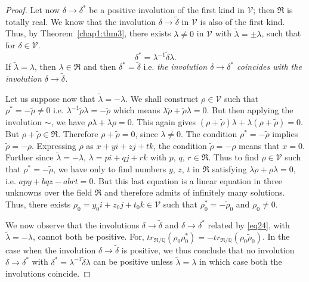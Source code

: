 \begin{proof}
Let now $\delta \rightarrow \delta^{\ast}$ be a positive involution of
the first kind in $\mathscr{V}$; then $\mathfrak{R}$ is totally
real. We know that the involution $\delta \rightarrow
\widetilde{\delta}$ in $\mathscr{V}$ is also of the first kind. Thus,
by Theorem~\ref{chap1:thm3}, there exists $\lambda \neq 0$ in $\mathscr{V}$ with
$\widetilde{\lambda} = \pm \lambda$, such that for $\delta \in
\mathscr{V}$. 
\begin{equation*}
\delta^{\ast} = \lambda^{-1} \widetilde{\delta} \lambda. \tag{24}\label{eq24}
\end{equation*}\pageoriginale
If $\widetilde{\lambda} = \lambda$, then $\lambda \in \mathfrak{R}$
and then $\delta^{\ast} = \widetilde{\delta}$ i.e. {\em the involution
$\delta \rightarrow \delta^{\ast}$ coincides with the involution
  $\delta \rightarrow \widetilde{\delta}$.}

Let us suppose now that $\widetilde{\lambda} = - \lambda$. We shall
construct $\rho \in \mathscr{V}$ such that $\rho^{\ast} = -
\widetilde{\rho} \neq 0$ i.e. $\lambda^{-1} \widetilde{\rho} \lambda =
- \widetilde{\rho}$ which means $\lambda \widetilde{\rho} +
\widetilde{\rho} \lambda = 0$. But then applying the involution
$\sim$, we have $\rho\lambda + \lambda\rho =0$. This again gives
$(\rho+\widetilde{\rho})\lambda+\lambda(\rho+\widetilde{\rho})=0$. But
$\rho+\widetilde{\rho} \in \mathfrak{R}$. Therefore
$\rho+\widetilde{\rho} = 0$, since $\lambda \neq 0$. The condition
$\rho^{\ast} = - \widetilde{\rho}$ implies
$\widetilde{\rho}=-\rho$. Expressing $\rho$ as $x+yi+zj+tk$, the
condition $\widetilde{\rho}=-\rho$ means that $x=0$. Further since
$\widetilde{\lambda} = - \lambda$, $\lambda = pi + qj+rk$ with $p$,
$q$, $r\in \mathfrak{R}$. Thus to find $\rho\in \mathscr{V}$ such that
$\rho^{\ast} = -\widetilde{\rho}$, we have only to find numbers $y$,
$z$, $t$ in $\mathfrak{R}$ satisfying $\lambda \rho+\rho \lambda =0$,
i.e. $apy+bqz-abrt =0$. But this last equation is a linear equation in
three unknowns over the field $\mathfrak{R}$ and therefore admits of
infinitely many solutions. Thus, there exists $\rho_0=y_0 i + z_0 j +
t_0 k \in \mathscr{V}$ such that $\rho^{\ast}_0 = -
\widetilde{\rho}_0$ and $\rho_0 \neq 0$.

We now observe that the involutions $\delta \rightarrow
\widetilde{\delta}$ and $\delta \rightarrow \delta^{\ast}$ related by
\eqref{eq24}, with $\widetilde{\lambda}=-\lambda$, cannot both be
positive. For, $tr_{\mathfrak{R}/\mathbb{Q}}(\rho_0 \rho^{\ast}_0) = -
tr_{\mathfrak{R}/\mathbb{Q}}(\rho_0 \widetilde{\rho}_0)$. In the case
when the involution $\delta \rightarrow \widetilde{\delta}$ is
positive, we thus conclude that no involution $\delta \rightarrow
\delta^{\ast}$ with $\delta^{\ast}= \lambda^{-1}
\widetilde{\delta}\lambda$ can be positive unless $\widetilde{\lambda}
= \lambda$ in which case both the involutions coincide.


\end{proof}
